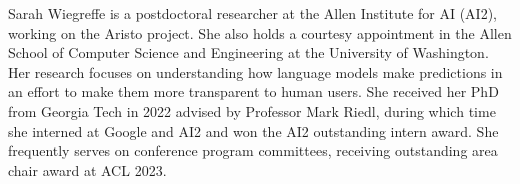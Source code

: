 Sarah Wiegreffe is a postdoctoral researcher at the Allen Institute for AI (AI2), working on the Aristo project. 
She also holds a courtesy appointment in the Allen School of Computer Science and Engineering at the University of Washington. 
Her research focuses on understanding how language models make predictions in an effort to make them more transparent to human users. 
She received her PhD from Georgia Tech in 2022 advised by Professor Mark Riedl, during which time she interned at Google and AI2 and won the AI2 outstanding intern award. 
She frequently serves on conference program committees, receiving outstanding area chair award at ACL 2023.